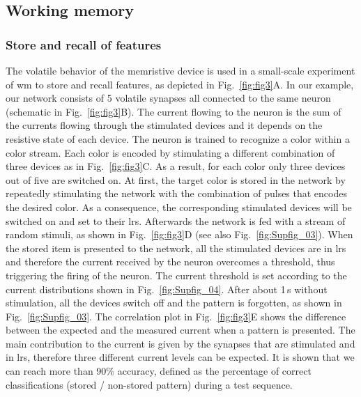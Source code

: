 \subsection{Working memory}
\subsubsection{Store and recall of features}

The volatile behavior of the memristive device is used in a small-scale experiment of \gls{wm} to store and recall features, as depicted in Fig.~\ref{fig:fig3}A. In our example, our network consists of 5 volatile synapses all connected to the same neuron (schematic in Fig.~\ref{fig:fig3}B). The current flowing to the neuron is the sum of the currents flowing through the stimulated devices and it depends on the resistive state of each device. The neuron is trained to recognize a color within a color stream. Each color is encoded by stimulating a different combination of three devices as in Fig.~\ref{fig:fig3}C. As a result, for each color only three devices out of five are switched on. At first, the target color is stored in the network by repeatedly stimulating the network with the combination of pulses that encodes the desired color. As a consequence, the corresponding stimulated devices will be switched on and set to their \gls{lrs}. Afterwards the network is fed with a stream of random stimuli, as shown in Fig.~\ref{fig:fig3}D (see also Fig.~\ref{fig:Supfig_03}). When the stored item is presented to the network, all the stimulated devices are in \gls{lrs} and therefore the current received by the neuron overcomes a threshold, thus triggering the firing of the neuron. The current threshold is set according to the current distributions shown in Fig.~\ref{fig:Supfig_04}. After about 1\,s without stimulation, all the devices switch off and the pattern is forgotten, as shown in Fig.~\ref{fig:Supfig_03}. The correlation plot in Fig.~\ref{fig:fig3}E shows the difference between the expected and the measured current when a pattern is presented. The main contribution to the current is given by the synapses that are stimulated and in \gls{lrs}, therefore three different current levels can be expected. It is shown that we can reach more than 90\% accuracy, defined as the percentage of correct classifications (stored / non-stored pattern) during a test sequence. %

